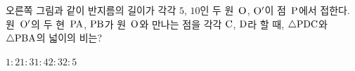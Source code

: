 \noindent\begin{minipage}[t]{0.58\linewidth}\vspace{0pt}\raggedright 오른쪽 그림과 같이 반지름의 길이가 각각 $5$, $10$인 두 원~$\mathrm{O}$, $\mathrm{O'}$이 점~$\mathrm{P}$에서 접한다. 원~$\mathrm{O'}$의 두 현~$\mathrm{PA}$, $\mathrm{PB}$가 원~$\mathrm{O}$와 만나는 점을 각각 $\mathrm{C}$, $\mathrm{D}$라 할 때, $\triangle\mathrm{PDC}$와 $\triangle\mathrm{PBA}$의 넓이의 비는?\end{minipage}\hfill\begin{minipage}[t]{0.4\linewidth}\vspace{0pt}\centering \resizebox{\ifdim\width>\linewidth\linewidth\else\width\fi}{!}{}\end{minipage}\par
\begin{choices32}{$1:2$}{$1:3$}{$1:4$}{$2:3$}{$2:5$}\end{choices32}
